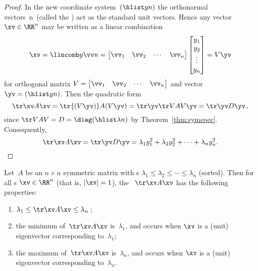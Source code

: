 \begin{proof} 
In the new coordinate system~\((\hlist yn)\) the orthonormal vectors~\hlist\vv n\ (called the ) act as the standard unit vectors.
Hence any vector \(\xv\in\RR^n\) may be written as a linear combination
\begin{equation*}
\xv=\lincomb y\vv n
=\begin{bmatrix} \vv_1&\vv_2&\cdots&\vv_n \end{bmatrix}\begin{bmatrix} y_1\\y_2\\\vdots\\y_n \end{bmatrix}
=V\yv
\end{equation*}
for orthogonal matrix \(V=\begin{bmatrix} \vv_1&\vv_2&\cdots&\vv_n \end{bmatrix}\) and vector \(\yv=(\hlist yn)\).
Then the quadratic form 
\begin{equation*}
\tr\xv A\xv=\tr{(V\yv)} A(V\yv)=\tr\yv \tr VAV\yv=\tr\yv D\yv\,,
\end{equation*}
since \(\tr VAV=D=\diag(\hlist\lambda n)\) by Theorem~\ref{thm:symspec}.
Consequently,
\begin{equation*}
\tr\xv A\xv=\tr\yv D\yv=\lambda_1y_1^2+\lambda_2y_2^2+\cdots+\lambda_ny_n^2.
\end{equation*}
\end{proof}



\begin{comment}
Maybe applications to moment of inertia? and the rotating lunch box?
extreme stresses in a solid?
Could link to SVD and extreme values of length \(|A\xv|\): but where is it best established?
\end{comment}




\begin{theorem} \label{thm:optqform}
Let~\(A\) be an \(n\times n\) symmetric matrix with s \(\lambda_1\leq\lambda_2\leq\cdots\leq\lambda_n\) (sorted). 
Then for all s \(\xv\in\RR^n\) (that is, \(|\xv|=1\)), the ~\(\tr\xv A\xv\) has the following properties:
\begin{enumerate}
\item \(\lambda_1\leq \tr\xv A\xv\leq\lambda_n\)\,;
\item the minimum of~\(\tr\xv A\xv\) is~\(\lambda_1\), and occurs when \(\xv\) is a (unit) eigenvector corresponding to~\(\lambda_1\);
\item the maximum of~\(\tr\xv A\xv\) is~\(\lambda_n\), and occurs when \(\xv\) is a (unit) eigenvector corresponding to~\(\lambda_n\).
\end{enumerate}
\end{theorem}

